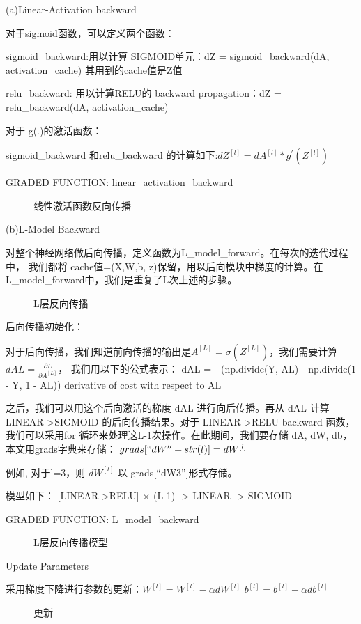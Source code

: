 \documentclass[UTF8]{ctexart}
\begin{document}
(a)Linear-Activation backward

对于sigmoid函数，可以定义两个函数：

sigmoid\_backward:用以计算 SIGMOID单元：dZ = sigmoid\_backward(dA, activation\_cache) 其用到的cache值是Z值

relu\_backward: 用以计算RELU的 backward propagation：dZ = relu\_backward(dA, activation\_cache)

对于 g(.)的激活函数：

sigmoid\_backward 和relu\_backward 的计算如下:$dZ^{[l]}=dA^{[l]}*g^{'}(Z^{[l]})$

GRADED FUNCTION: linear\_activation\_backward
\begin{figure}[htb]
 \caption{线性激活函数反向传播}
 \label{fig:10}
 \end{figure}

 (b)L-Model Backward

对整个神经网络做后向传播，定义函数为L\_model\_forward。在每次的迭代过程中，
我们都将 cache值=(X,W,b, z)保留，用以后向模块中梯度的计算。在L\_model\_forward中，我们是重复了L次上述的步骤。
\begin{figure}[htb]
 \caption{L层反向传播}
 \label{fig:11}
 \end{figure}

 后向传播初始化：

 对于后向传播，我们知道前向传播的输出是$A^{[L]}=\sigma (Z^{[L]})$，我们需要计算 $dAL=\frac{\partial L}{\partial A^{[L]}}$，
 我们用以下的公式表示：
 dAL = - (np.divide(Y, AL) - np.divide(1 - Y, 1 - AL)) derivative of cost with respect to AL

 之后，我们可以用这个后向激活的梯度 dAL 进行向后传播。再从 dAL 计算 LINEAR->SIGMOID 的后向传播结果。对于 LINEAR->RELU backward 函数，
 我们可以采用for 循环来处理这L-1次操作。在此期间，我们要存储 dA, dW, db，本文用grads字典来存储：
 $grads[``dW''+str(l)]=dW^{[l]}$

 例如, 对于l=3，则 $dW^{[l]}$ 以 grads[``dW3'']形式存储。

 模型如下：
 [LINEAR->RELU] × (L-1) -> LINEAR -> SIGMOID

GRADED FUNCTION: L\_model\_backward
\begin{figure}[htb]
 \caption{L层反向传播模型}
  \label{fig:12}
 \end{figure}

 Update Parameters

 采用梯度下降进行参数的更新：$W^{[l]}=W^{[l]}−\alpha dW^{[l]}$ $ b^{[l]}=b^{[l]}−\alpha db^{[l]}$
 \begin{figure}[htb]
  \caption{更新}
   \label{fig:13}
  \end{figure}
\end{document}
